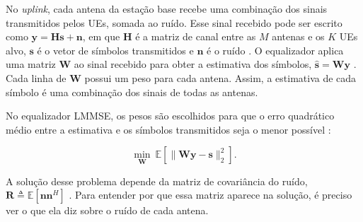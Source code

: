 %
%
%



No \textit{uplink}, cada antena da estação base recebe uma combinação dos sinais transmitidos pelos UEs, somada ao ruído. Esse sinal recebido pode ser escrito como $\mathbf{y}=\mathbf{H}\mathbf{s}+\mathbf{n}$, em que $\mathbf{H}$ é a matriz de canal entre as $M$ antenas e os $K$ UEs alvo, $\mathbf{s}$ é o vetor de símbolos transmitidos e $\mathbf{n}$ é o ruído \cite{zhao-lmmse}.
O equalizador aplica uma matriz $\mathbf{W}$ ao sinal recebido para obter a estimativa dos símbolos, $\hat{\mathbf{s}}=\mathbf{W}\mathbf{y}$ \cite{zhao-lmmse}.
Cada linha de $\mathbf{W}$ possui um peso para cada antena. Assim, a estimativa de cada símbolo é uma combinação dos sinais de todas as antenas.

No equalizador LMMSE, os pesos são escolhidos para que o erro quadrático médio entre a estimativa e os símbolos transmitidos seja o menor possível \cite{zhao-lmmse}:

$$
\min_{\mathbf{W}}\ \mathbb{E}\left[\|\mathbf{W}\mathbf{y}-\mathbf{s}\|_2^2\right].
$$

A solução desse problema depende da matriz de covariância do ruído, $\mathbf{R}\triangleq\mathbb{E}[\mathbf{n}\mathbf{n}^H]$ \cite{zhao-lmmse}. Para entender por que essa matriz aparece na solução, é preciso ver o que ela diz sobre o ruído de cada antena.


